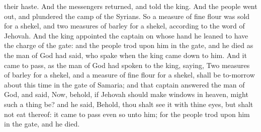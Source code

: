 their haste. And the messengers returned, and told the king.  And the people went out, and plundered the camp of the Syrians. So a measure of fine flour was sold for a shekel, and two measures of barley for a shekel, according to the word of Jehovah. And the king appointed the captain on whose hand he leaned to have the charge of the gate: and the people trod upon him in the gate, and he died as the man of God had said, who spake when the king came down to him. And it came to pass, as the man of God had spoken to the king, saying, Two measures of barley for a shekel, and a measure of fine flour for a shekel, shall be to-morrow about this time in the gate of Samaria; and that captain answered the man of God, and said, Now, behold, if Jehovah should make windows in heaven, might such a thing be? and he said, Behold, thou shalt see it with thine eyes, but shalt not eat thereof: it came to pass even so unto him; for the people trod upon him in the gate, and he died. 

